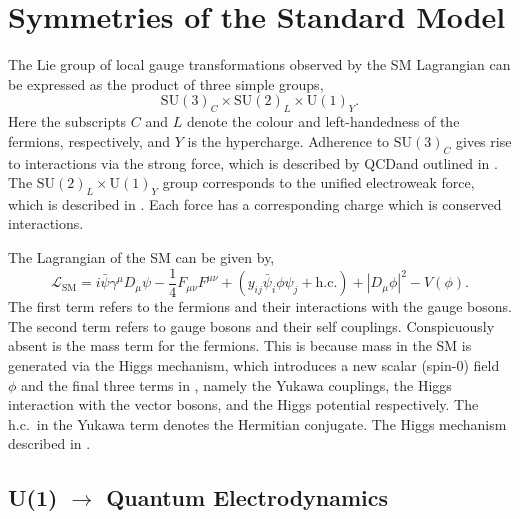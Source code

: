 \section{Symmetries of the Standard Model}
\label{sec:symmetries_of_sm}

The Lie group of local gauge transformations observed by the SM Lagrangian can be expressed as the product of three simple groups,
\begin{equation}
	\label{eq:sm_group}
	\text{SU}(3)_C \times \text{SU}(2)_L \times \text{U}(1)_Y.
\end{equation}
Here the subscripts $C$ and $L$ denote the colour and left-handedness of the fermions, respectively, and $Y$ is the hypercharge.
Adherence to $\text{SU}(3)_C$ gives rise to interactions via the strong force, which is described by QCD\@ and outlined in .
The $\text{SU}(2)_L \times \text{U}(1)_Y$ group corresponds to the unified electroweak force, which is described in .
Each force has a corresponding charge which is conserved interactions.

The Lagrangian of the SM can be given by,
\begin{equation}
	\label{eq:sm_lagrangian}
	\mathcal{L}_\text{SM} = i \bar \psi \gamma^\mu D_\mu \psi -\frac{1}{4} F_{\mu\nu} F^{\mu\nu} + (y_{ij} \bar \psi_i \phi \psi_j + \text{h.c.}) + |D_\mu \phi|^2 - V(\phi).
\end{equation}
The first term refers to the fermions and their interactions with the gauge bosons.
The second term refers to gauge bosons and their self couplings.
Conspicuously absent is the mass term for the fermions.
This is because mass in the SM is generated via the Higgs mechanism, which  introduces a new scalar (spin-0) field $\phi$ and the final three terms in , namely the Yukawa couplings, the Higgs interaction with the vector bosons, and the Higgs potential respectively.
The h.c.\ in the Yukawa term denotes the Hermitian conjugate.
The Higgs mechanism described in .

\subsection{U(1) \texorpdfstring{$\rightarrow$}{-} Quantum Electrodynamics}

